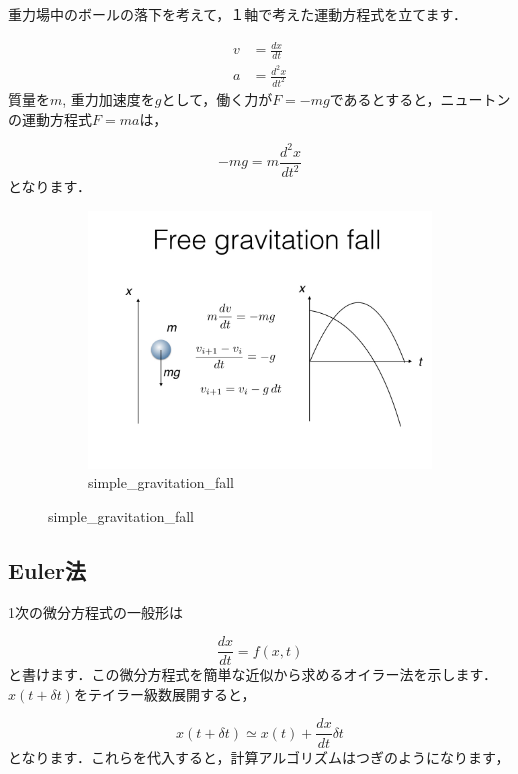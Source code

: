 \documentclass[11pt,dvipdfmx]{jsarticle}
\begin{document}
重力場中のボールの落下を考えて，１軸で考えた運動方程式を立てます．

\[
\begin{aligned}
v &= \frac{dx}{dt} \\
a &= \frac{d^2 x}{dt^2}
\end{aligned}
\] 質量を\(m\),
重力加速度を\(g\)として，働く力が\(F=-mg\)であるとすると，ニュートンの運動方程式\(F=ma\)は，

\[ 
-mg = m \frac{d^2 x}{dt^2}
\] となります．

\begin{figure}[htbp]
\centering
\begin{figure}
\begin{center}
\includegraphics[bb= 0 0 1024 768, width=150mm]{.././figs/ode.002.jpeg}
\caption{simple\_gravitation\_fall}

\label{fig:.ode.002.jpeg}
\end{center}
\end{figure}
\end{figure}

    \subsection{Euler法}\label{eulerux6cd5}

1次の微分方程式の一般形は

\[
\frac{dx}{dt}=f(x,t)
\]
と書けます．この微分方程式を簡単な近似から求めるオイラー法を示します．
\(x(t+\delta t)\)をテイラー級数展開すると，

\[
x(t+\delta t) \simeq x(t) + \frac{dx}{dt} \delta t
\]
となります．これらを代入すると，計算アルゴリズムはつぎのようになります，
\end{document}
